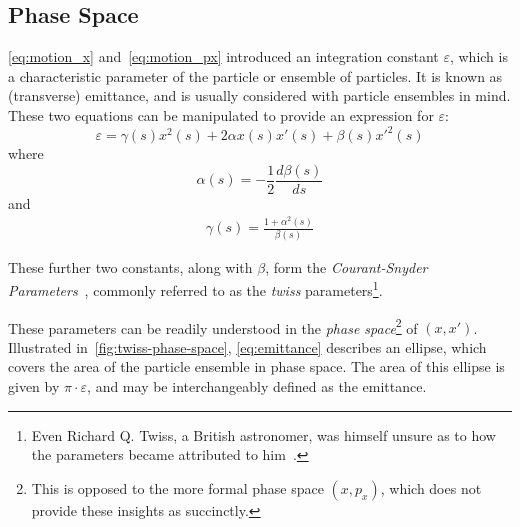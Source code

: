 \documentclass[11pt]{report}
\begin{document}
\subsection{Phase Space}\label{subsec:trans_phase_space}

\autoref{eq:motion_x} and~\autoref{eq:motion_px} introduced an integration constant $\varepsilon$, which is a characteristic parameter of the particle or ensemble of particles. It is known as (transverse) emittance, and is usually considered with particle ensembles in mind. These two equations can be manipulated to provide an expression for $\varepsilon$:
\begin{equation}
  \varepsilon = \gamma(s)x^2(s)+2\alpha x(s)x'(s)+\beta(s)x'^2(s)
  \label{eq:emittance}
\end{equation} where 
\begin{equation}
  \alpha(s) = -\frac12\frac{d\beta(s)}{ds}
  \label{eq:alpha}
\end{equation} and
\begin{eqnarray}
  \gamma(s) = \frac{1+\alpha^2(s)}{\beta(s)}
  \label{eq:gamma}
\end{eqnarray}

These further two constants, along with $\beta$, form the \textit{Courant-Snyder Parameters}~\cite{courantsnyder}, commonly referred to as the \textit{twiss} parameters\footnote{Even Richard Q. Twiss, a British astronomer, was himself unsure as to how the parameters became attributed to him~\cite{richardtwiss}.}. 

These parameters can be readily understood in the \textit{phase space}\footnote{This is opposed to the more formal phase space $(x, p_x)$, which does not provide these insights as succinctly.} of $(x, x')$. Illustrated in~\autoref{fig:twiss-phase-space}, \autoref{eq:emittance} describes an ellipse, which covers the area of the particle ensemble in phase space. The area of this ellipse is given by $\pi\cdot\varepsilon$, and may be interchangeably defined as the emittance. 
\end{document}
